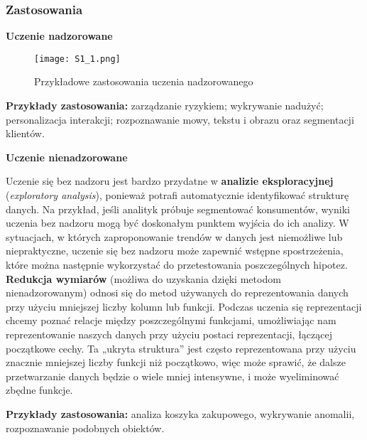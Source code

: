 \subsubsection{Zastosowania}

\centerline{\textbf{Uczenie nadzorowane}}

\begin{figure}[H]
	\centering
	\texttt{[image: S1\_1.png]}
	\caption{Przykładowe zastosowania uczenia nadzorowanego}
\end{figure}

\textbf{Przykłady zastosowania:} zarządzanie ryzykiem; wykrywanie nadużyć; personalizacja interakcji; rozpoznawanie mowy, tekstu i obrazu oraz segmentacji klientów.\\


\centerline{\textbf{Uczenie nienadzorowane}}

Uczenie się bez nadzoru jest bardzo przydatne w \textbf{analizie eksploracyjnej} (\textit{exploratory analysis}), ponieważ potrafi automatycznie identyfikować strukturę danych. Na przykład, jeśli analityk próbuje segmentować konsumentów, wyniki uczenia bez nadzoru mogą być doskonałym punktem wyjścia do ich analizy. W sytuacjach, w których zaproponowanie trendów w danych jest niemożliwe lub niepraktyczne, uczenie się bez nadzoru może zapewnić wstępne spostrzeżenia, które można następnie wykorzystać do przetestowania poszczególnych hipotez. \\

\textbf{Redukcja wymiarów} (możliwa do uzyskania dzięki metodom nienadzorowanym) odnosi się do metod używanych do reprezentowania danych przy użyciu mniejszej liczby kolumn lub funkcji. Podczas uczenia się reprezentacji chcemy poznać relacje między poszczególnymi funkcjami, umożliwiając nam reprezentowanie naszych danych przy użyciu postaci reprezentacji, łączącej początkowe cechy. Ta „ukryta struktura” jest często reprezentowana przy użyciu znacznie mniejszej liczby funkcji niż początkowo, więc może sprawić, że dalsze przetwarzanie danych będzie o wiele mniej intensywne, i może wyeliminować zbędne funkcje.

\textbf{Przykłady zastosowania:} analiza koszyka zakupowego, wykrywanie anomalii, rozpoznawanie podobnych obiektów.
